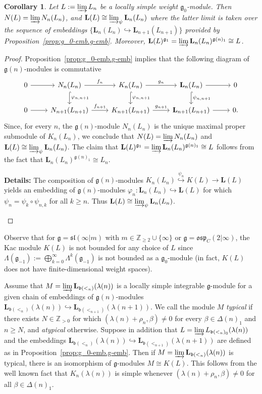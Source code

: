 \documentclass[12pt]{amsart}
\newcommand\Z{\mathbb{Z}}
\newcommand\g{\mathfrak{g}}
\newcommand\fb{\mathfrak{b}}
\newcommand\fsl{\mathfrak{sl}}
\newcommand\fosp{\mathfrak{osp}}
\newcommand\D{\Delta}
\newcommand\bL{\mathbf{L}}
\theoremstyle{plain}
\newtheorem{cor}[theo]{Corollary}
\theoremstyle{definition}
\numberwithin{equation}{section}
\newcommand{\details}[1]{\smallskip \color{blue} \begin{footnotesize} \textbf{Details:} #1 \end{footnotesize} \color{black}}
\newcommand{\details}[1]{}
\begin{document}
\begin{cor}\label{prop:Kac.mod.structure}
Let $L := \varinjlim L_n$ be a locally simple weight $\g_0$-module. Then  $N(L) = \varinjlim N_n(L_n)$, and $\bL(L)\cong \varinjlim_\psi \bL_n(L_n)$ where the latter limit is taken over the sequence of embeddings $\{\bL_n(L_n)\hookrightarrow \bL_{n+1}(L_{n+1})\}$ provided by Proposition~\ref{prop:g_0-emb.g-emb}. Moreover, $\bL(L)^{\g_1} = \varinjlim \bL_n(L_n)^{\g(n)_1} \cong L$.
\end{cor}
\begin{proof}
Proposition~\ref{prop:g_0-emb.g-emb} implies that the following diagram of $\g(n)$-modules is commutative
	\[
\begin{tikzcd}
0 \arrow[r] & N_n(L_n) \arrow[r, "f_n"] \arrow[d, hook, "\varphi_{n,n+1}"]  & K_n(L_n) \arrow[r, "g_n"] \arrow[d, hook, "\varphi_{n,n+1}"] & \bL_n(L_n) \arrow[r] \arrow[d, hook, "\psi_{n,n+1}"] & 0 \\
0 \arrow[r] & N_{n+1}(L_{n+1}) \arrow[r, "f_{n+1}"]  & K_{n+1}(L_{n+1}) \arrow[r, "g_{n+1}"] & \bL_{n+1}(L_{n+1}) \arrow[r] & 0.
\end{tikzcd}
	\]
Since, for every $n$, the $\g(n)$-module $N_n(L_n)$ is the unique maximal proper submodule of $K_n(L_n)$, we conclude that $N(L) = \varinjlim N_n(L_n)$ and $\bL(L)\cong \varinjlim_\psi \bL_n(L_n)$. The claim that $\bL(L)^{\g_1} = \varinjlim \bL_n(L_n)^{\g(n)_1} \cong L$ follows from the fact that $\bL_n(L_n)^{\g(n)_1}\cong L_n$.

 \details{The composition of $\g(n)$-modules $K_n(L_n)  \stackrel{\psi_n}{\hookrightarrow} K(L)\to \bL(L)$ yields an embedding of $\g(n)$-modules $\varphi_n : \bL_n(L_n) \hookrightarrow \bL(L)$ for which $\psi_n = \psi_k\circ \psi_{n,k}$ for all $k\geq n$. Thus $\bL(L)\cong \varinjlim_\psi \bL_n(L_n)$.}
\end{proof}

Observe that for $\g = \fsl(\infty|m)$ with $m\in \Z_{\geq 2}\cup\{\infty\}$ or $\g=\fosp_C(2|\infty)$, the Kac module $K(L)$ is not bounded for any choice of $L$ since $\Lambda (\g_{-1}):=\bigoplus_{k=0}^\infty \Lambda^k (\g_{-1})$ is not bounded as a $\g_0$-module (in fact, $K(L)$ does not have finite-dimensional weight spaces). 

Assume that $M = \varinjlim \bL_{\fb(<_n)}(\lambda(n))$ is a locally simple integrable $\g$-module for a given chain of embeddings of $\g(n)$-modules $\bL_{\fb(<_n)}(\lambda(n))\hookrightarrow \bL_{\fb(<_{n+1})}(\lambda(n+1))$. We call the module $M$ \emph{typical} if there exists $N\in \Z_{>0}$ for which $(\lambda(n) + \rho_n, \beta) \neq 0$ for every $\beta\in \D(n)_{1}$ and $n\geq N$, and \emph{atypical} otherwise. Suppose in addition that $L = \varinjlim L_{\fb(<_n)_{\bar 0}}(\lambda(n))$ and the embeddings $\bL_{\fb(<_n)}(\lambda(n))\hookrightarrow \bL_{\fb(<_{n+1})}(\lambda(n+1))$ are defined as in Proposition~\ref{prop:g_0-emb.g-emb}. Then if $M = \varinjlim \bL_{\fb(<_n)}(\lambda(n))$ is typical, there is an isomorphism of $\g$-modules $M \cong K(L)$. This follows from the well known fact that $K_n(\lambda(n))$ is simple whenever $(\lambda(n) + \rho_n, \beta) \neq 0$ for all $\beta\in \D(n)_{1}$.
\end{document}
